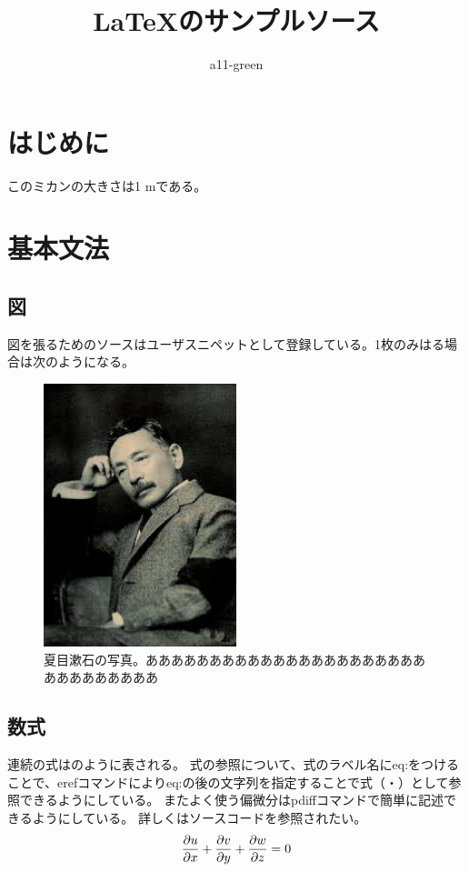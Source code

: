 \documentclass[uplatex]{jsarticle}
\title{\LaTeX のサンプルソース}
\author{a11-green}
\begin{document}
\maketitle
\tableofcontents

\newpage
\section{はじめに}
このミカンの大きさは1 \si{m}である\cite{Soseki1905}。

\section{基本文法}
\subsection{図}
図を張るためのソースはユーザスニペットとして登録している。1枚のみはる場合は次のようになる。
\begin{figure}[H]
	\centering
	\includegraphics[width=0.5\textwidth]{figure/natsume_soseki.jpeg}
	\caption{夏目漱石の写真\cite{Soseki1905}。あああああああああああああああああああああああああああああああ}
	\label{fig:夏目漱石の写真}
\end{figure}


\subsection{数式}
連続の式はのように表される。
式の参照について、式のラベル名にeq:をつけることで、erefコマンドによりeq:の後の文字列を指定することで式（・）として参照できるようにしている。
またよく使う偏微分はpdiffコマンドで簡単に記述できるようにしている。
詳しくはソースコードを参照されたい。
\begin{align}
	\pdiff{1}{u}{x} + \pdiff{1}{v}{y} + \pdiff{1}{w}{z} = 0
	\label{eq:mass-conservation}
\end{align}





\end{document}
